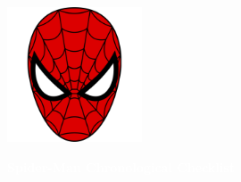 \documentclass[12pt]{article}
\begin{document}
\vspace*{1cm}
\noindent
\begin{minipage}{\textwidth}
\begin{center}
    \includegraphics[width=4cm]{spiderman.png}
    
    \vspace{0.75cm}
    {\Huge \textbf{\textcolor{white}{Spider-Man Chronological Checklist}}}
    
    \vspace{1cm}
    

\end{center}
\end{minipage}
\end{document}
